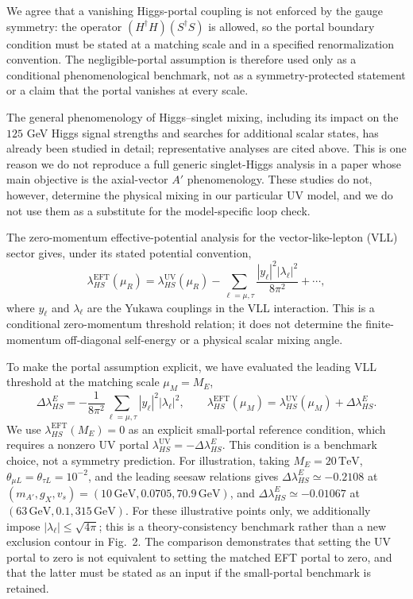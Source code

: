 \documentclass[12pt,a4paper]{article}
\begin{document}
We agree that a vanishing Higgs-portal coupling is not enforced by the gauge symmetry: the operator \((H^\dagger H)(S^\dagger S)\) is allowed, so the portal boundary condition must be stated at a matching scale and in a specified renormalization convention. The negligible-portal assumption is therefore used only as a conditional phenomenological benchmark, not as a symmetry-protected statement or a claim that the portal vanishes at every scale.

The general phenomenology of Higgs--singlet mixing, including its impact on the \(125\) GeV Higgs signal strengths and searches for additional scalar states, has already been studied in detail; representative analyses are cited above. This is one reason we do not reproduce a full generic singlet-Higgs analysis in a paper whose main objective is the axial-vector \(A'\) phenomenology. These studies do not, however, determine the physical mixing in our particular UV model, and we do not use them as a substitute for the model-specific loop check.

The zero-momentum effective-potential analysis for the vector-like-lepton (VLL) sector gives, under its stated potential convention,
\[
\lambda_{HS}^{\mathrm{EFT}}(\mu_R)
=\lambda_{HS}^{\mathrm{UV}}(\mu_R)
-\sum_{\ell=\mu,\tau}
\frac{|y_\ell|^2|\lambda_\ell|^2}{8\pi^2}
+\cdots,
\]
where \(y_\ell\) and \(\lambda_\ell\) are the Yukawa couplings in the VLL interaction. This is a conditional zero-momentum threshold relation; it does not determine the finite-momentum off-diagonal self-energy or a physical scalar mixing angle.

To make the portal assumption explicit, we have evaluated the leading VLL threshold at the matching scale \(\mu_M=M_E\),
\[
\Delta\lambda_{HS}^{E}
=-\frac{1}{8\pi^2}\sum_{\ell=\mu,\tau}|y_\ell|^2|\lambda_\ell|^2,
\qquad
\lambda_{HS}^{\mathrm{EFT}}(\mu_M)
=\lambda_{HS}^{\mathrm{UV}}(\mu_M)+\Delta\lambda_{HS}^{E}.
\]
We use \(\lambda_{HS}^{\mathrm{EFT}}(M_E)=0\) as an explicit small-portal reference condition, which requires a nonzero UV portal \(\lambda_{HS}^{\mathrm{UV}}=-\Delta\lambda_{HS}^{E}\). This condition is a benchmark choice, not a symmetry prediction. For illustration, taking \(M_E=20\,\mathrm{TeV}\), \(\theta_{\mu L}=\theta_{\tau L}=10^{-2}\), and the leading seesaw relations gives \(\Delta\lambda_{HS}^{E}\simeq-0.2108\) at \((m_{A'},g_X,v_s)=(10\,\mathrm{GeV},0.0705,70.9\,\mathrm{GeV})\), and \(\Delta\lambda_{HS}^{E}\simeq-0.01067\) at \((63\,\mathrm{GeV},0.1,315\,\mathrm{GeV})\). For these illustrative points only, we additionally impose \(|\lambda_\ell|\leq\sqrt{4\pi}\); this is a theory-consistency benchmark rather than a new exclusion contour in Fig.~2. The comparison demonstrates that setting the UV portal to zero is not equivalent to setting the matched EFT portal to zero, and that the latter must be stated as an input if the small-portal benchmark is retained.
\end{document}

